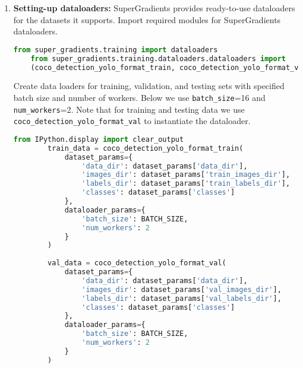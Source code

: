 \begin{enumerate}
    \item \textbf{Setting-up dataloaders: }  SuperGradients provides ready-to-use dataloaders for the datasets it supports. Import required modules for SuperGradients dataloaders.
    \begin{lstlisting}[language=Python, caption=Setting-Up Dataloaders]
    from super_gradients.training import dataloaders
    from super_gradients.training.dataloaders.dataloaders import
    (coco_detection_yolo_format_train, coco_detection_yolo_format_val) 
    \end{lstlisting}
     Create data loaders for training, validation, and testing sets with specified batch size and number of workers. Below we use \texttt{batch\_size}=16 and \texttt{num\_workers}=2. Note that for training and testing data we use \verb|coco_detection_yolo_format_val| to instantiate the dataloader.  
     \begin{lstlisting}[language=Python, caption=Setting-Up Dataloaders]
        from IPython.display import clear_output 
        train_data = coco_detection_yolo_format_train(
            dataset_params={
                'data_dir': dataset_params['data_dir'],
                'images_dir': dataset_params['train_images_dir'],
                'labels_dir': dataset_params['train_labels_dir'],
                'classes': dataset_params['classes']
            },
            dataloader_params={
                'batch_size': BATCH_SIZE,
                'num_workers': 2
            }
        )
        
        val_data = coco_detection_yolo_format_val(
            dataset_params={
                'data_dir': dataset_params['data_dir'],
                'images_dir': dataset_params['val_images_dir'],
                'labels_dir': dataset_params['val_labels_dir'],
                'classes': dataset_params['classes']
            },
            dataloader_params={
                'batch_size': BATCH_SIZE,
                'num_workers': 2
            }
        )
        

\end{lstlisting}
\end{enumerate}
